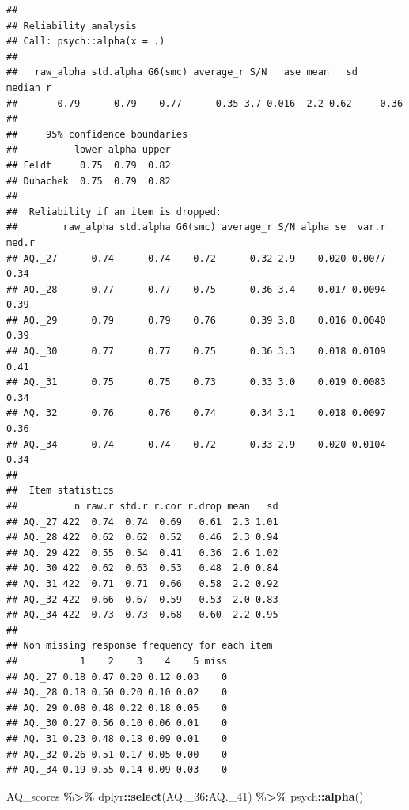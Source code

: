 \documentclass[
]{article}
\newenvironment{Shaded}{\begin{snugshade}}{\end{snugshade}}
\newcommand{\FunctionTok}[1]{\textcolor[rgb]{0.13,0.29,0.53}{\textbf{#1}}}
\newcommand{\NormalTok}[1]{#1}
\newcommand{\SpecialCharTok}[1]{\textcolor[rgb]{0.81,0.36,0.00}{\textbf{#1}}}
\begin{document}
\begin{verbatim}
## 
## Reliability analysis   
## Call: psych::alpha(x = .)
## 
##   raw_alpha std.alpha G6(smc) average_r S/N   ase mean   sd median_r
##       0.79      0.79    0.77      0.35 3.7 0.016  2.2 0.62     0.36
## 
##     95% confidence boundaries 
##          lower alpha upper
## Feldt     0.75  0.79  0.82
## Duhachek  0.75  0.79  0.82
## 
##  Reliability if an item is dropped:
##        raw_alpha std.alpha G6(smc) average_r S/N alpha se  var.r med.r
## AQ._27      0.74      0.74    0.72      0.32 2.9    0.020 0.0077  0.34
## AQ._28      0.77      0.77    0.75      0.36 3.4    0.017 0.0094  0.39
## AQ._29      0.79      0.79    0.76      0.39 3.8    0.016 0.0040  0.39
## AQ._30      0.77      0.77    0.75      0.36 3.3    0.018 0.0109  0.41
## AQ._31      0.75      0.75    0.73      0.33 3.0    0.019 0.0083  0.34
## AQ._32      0.76      0.76    0.74      0.34 3.1    0.018 0.0097  0.36
## AQ._34      0.74      0.74    0.72      0.33 2.9    0.020 0.0104  0.34
## 
##  Item statistics 
##          n raw.r std.r r.cor r.drop mean   sd
## AQ._27 422  0.74  0.74  0.69   0.61  2.3 1.01
## AQ._28 422  0.62  0.62  0.52   0.46  2.3 0.94
## AQ._29 422  0.55  0.54  0.41   0.36  2.6 1.02
## AQ._30 422  0.62  0.63  0.53   0.48  2.0 0.84
## AQ._31 422  0.71  0.71  0.66   0.58  2.2 0.92
## AQ._32 422  0.66  0.67  0.59   0.53  2.0 0.83
## AQ._34 422  0.73  0.73  0.68   0.60  2.2 0.95
## 
## Non missing response frequency for each item
##           1    2    3    4    5 miss
## AQ._27 0.18 0.47 0.20 0.12 0.03    0
## AQ._28 0.18 0.50 0.20 0.10 0.02    0
## AQ._29 0.08 0.48 0.22 0.18 0.05    0
## AQ._30 0.27 0.56 0.10 0.06 0.01    0
## AQ._31 0.23 0.48 0.18 0.09 0.01    0
## AQ._32 0.26 0.51 0.17 0.05 0.00    0
## AQ._34 0.19 0.55 0.14 0.09 0.03    0
\end{verbatim}

\begin{Shaded}
\begin{Highlighting}[]
\NormalTok{AQ\_scores }\SpecialCharTok{\%\textgreater{}\%}\NormalTok{ dplyr}\SpecialCharTok{::}\FunctionTok{select}\NormalTok{(AQ.\_36}\SpecialCharTok{:}\NormalTok{AQ.\_41) }\SpecialCharTok{\%\textgreater{}\%}\NormalTok{ psych}\SpecialCharTok{::}\FunctionTok{alpha}\NormalTok{()}
\end{Highlighting}
\end{Shaded}
\end{document}

